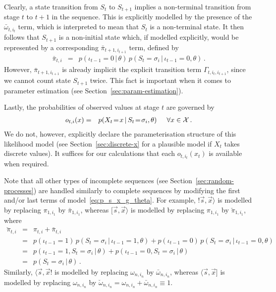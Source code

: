 \documentclass[a4paper]{article}
\begin{document}
Clearly, a state transition from $S_t$ to $S_{t+1}$ implies a non-terminal transition from stage $t$ to $t+1$ in the sequence. 
This is explicitly modelled by the presence of the $\bar{\omega}_{t,i_t}$ term,
which is interpreted to mean that $S_t$ is a non-terminal state.
It then follows that $S_{t+1}$ is a non-initial state which, if modelled explicitly, would be represented by a corresponding $\bar{\pi}_{t+1,i_{t+1}}$ term, defined by
\begin{eqnarray}
  \bar{\pi}_{t,i} & = & p(\iota_{t-1}\!=\!0\,|\,\theta)\,p(S_{t}\!=\!\sigma_{i}\,|\,\iota_{t-1}\!=\!0,\theta)\,.
\end{eqnarray}
However, $\bar{\pi}_{t+1,i_{t+1}}$ is already implicit the explicit transition term $\Gamma_{t,i_t,i_{t+1}}$,
since we cannot count state $S_{t+1}$ twice. This fact is important when it comes to parameter estimation (see Section~\ref{sec:param-estimation}).

Lastly, the probabilities of observed values at stage $t$ are governed by
\begin{eqnarray}
  o_{t,i}(x) & = & p(X_t\!=\!x\,|\,S_t\!=\!\sigma_{i},\theta) \hspace*{5mm}\forall x\in{\cal X}\,.
\end{eqnarray}
We do not, however, explicitly declare the parameterisation structure of this likelihood model (see Section~\ref{sec:discrete-x} for a plausible model if $X_t$ takes discrete values). 
It suffices for our calculations that each $o_{t,i_t}(x_t)$ is available when required.

Note that all other types of incomplete sequences (see Section~\ref{sec:random-processes}) are handled similarly to complete sequences by modifying the first and/or last terms of model~\eqref{eq:p_s_x_g_theta}.
For example, $!\vec{s},\vec{x}\rangle$ is modelled by replacing $\pi_{1,i_1}$ by $\bar{\pi}_{1,i_1}$, whereas $[\vec{s},\vec{x}\rangle$ is modelled by replacing $\pi_{1,i_1}$ by $\breve{\pi}_{1,i_1}$, where
\begin{eqnarray}
  \breve{\pi}_{t,i} & = & \pi_{t,i}+\bar{\pi}_{t,i}
\nonumber\\& = &
  p(\iota_{t-1}\!=\!1)\,p(S_t\!=\!\sigma_{i}\,|\,\iota_{t-1}\!=\!1,\theta)
+
  p(\iota_{t-1}\!=\!0)\,p(S_t\!=\!\sigma_{i}\,|\,\iota_{t-1}\!=\!0,\theta)
\nonumber\\& = &
  p(\iota_{t-1}\!=\!1,S_t\!=\!\sigma_{i}\,|\,\theta)
+
  p(\iota_{t-1}\!=\!0,S_t\!=\!\sigma_{i}\,|\,\theta)
\nonumber\\& = &
  p(S_t\!=\!\sigma_{i}\,|\,\theta)\,.
\end{eqnarray}
Similarly, $\langle\vec{s},\vec{x}!$ is modelled by replacing $\omega_{n,i_{n}}$ by $\bar{\omega}_{n,i_{n}}$, whereas $\langle\vec{s},\vec{x}]$ 
is modelled by replacing $\omega_{n,i_n}$ by $\breve{\omega}_{n,i_n}=\omega_{n,i_n}+\bar{\omega}_{n,i_n}\equiv 1$.
\end{document}
